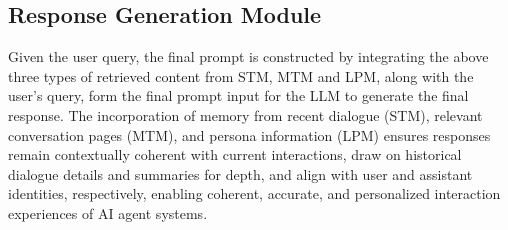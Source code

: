 \documentclass[11pt]{article}
\begin{document}

\subsection{Response Generation Module}

Given the user query, the final prompt is constructed by integrating the above three types of retrieved content from STM, MTM and LPM, along with the user's query, form the final prompt input for the LLM to generate the final response.
The incorporation of memory from recent dialogue (STM), relevant conversation pages (MTM), and persona information (LPM)  ensures responses remain contextually coherent with current interactions, draw on historical dialogue details and summaries for depth, and align with user and assistant identities, respectively,  enabling coherent, accurate, and personalized interaction experiences of AI agent systems.

  
  
\end{document}
